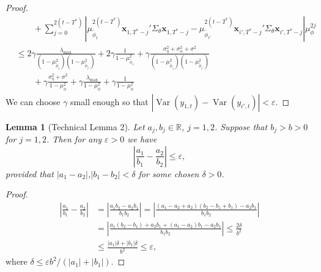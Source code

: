\documentclass[11pt]{article}
\newcommand{\R}{\mathbb{R}}
\newcommand{\x}{\textbf{x}}
\DeclareMathOperator{\Var}{Var} %
\newtheorem{lem}{Lemma}
\theoremstyle{definition}
\begin{document}
\begin{proof}
\begin{align*}
   &\qquad+ \sum_{j=0}^{2(t - T^*)}\left\vert \mu_{\tilde\phi_1}^{2(t - T^*)}\x_{1,T^*-j}'\Sigma_\theta\x_{1,T^*-j} - \mu_{\tilde\phi_{i'}}^{2(t - T^*)}\x_{i',T^*-j}'\Sigma_\theta\x_{i',T^*-j} \right\vert \mu_{\phi}^{2j} \\
   &\leq 2\gamma\frac{\lambda_{\max}}{(1 - \mu_{\tilde\phi_1}^{2})(1 - \mu_{\tilde\phi_{i'}}^{2})} + 2\gamma\frac{1}{1 - \mu_{\tilde\phi_1}^2} + \gamma\frac{\sigma^2_\eta + \sigma^2_{\alpha}+ \sigma^2}{(1 - \mu_{\tilde\phi_1}^{2})(1 - \mu_{\tilde\phi_{i'}}^{2})} \\ 
   &\qquad + \gamma\frac{\sigma^2_\eta + \sigma^2}{1 - \mu_\phi^2} + \gamma\frac{\lambda_{\max}}{1 - \mu_\phi^2} + \gamma\frac{1}{1 - \mu_\phi^2}
   \end{align*}
We can choose $\gamma$ small enough so that $|\Var(y_{1,t}) - \Var(y_{i',t})| < \varepsilon$.
\end{proof}

\begin{lem}[Technical Lemma 2] \label{lem:diffsig2noise}
Let $a_j, b_j \in \R$, $j = 1,2$. Suppose that $b_j > b > 0$ for $j = 1,2$. Then for any $\varepsilon > 0$ we have 
$$
  \left\vert\frac{a_1}{b_1} - \frac{a_2}{b_2}\right\vert \leq \varepsilon,
$$
provided that $|a_1-a_2|$,$|b_1-b_2| < \delta$ for some chosen $\delta > 0$.
\end{lem}

\begin{proof}
\begin{align*}
  \left\vert\frac{a_1}{b_1} - \frac{a_2}{b_2}\right\vert 
    &= \left\vert\frac{a_1b_2 - a_2b_1}{b_1b_2}\right\vert 
    = \left\vert\frac{(a_1 - a_2 + a_2)(b_2 - b_1 + b_1) - a_2b_1}{b_1b_2}\right\vert \\
    &= \left\vert \frac{a_1(b_2 - b_1) + a_2b_1 + (a_1 - a_2)b_1 - a_2b_1}{b_1b_2} \right\vert \leq \frac{2\delta}{b^2} \\
    &\leq \frac{|a_1|\delta + |b_1|\delta}{b^2} \leq \varepsilon, 
\end{align*}
where $\delta \leq \varepsilon b^2/(|a_1| + |b_1|)$.
\end{proof}
\end{document}
